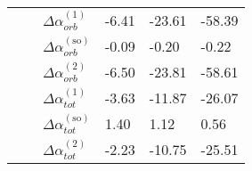 \begin{longtable}{llllll}
      &         & $\Delta \alpha_{orb}^{(\text{1})}$ &         -6.41 &      -23.61 &      -58.39 \\
      &         & $\Delta \alpha_{orb}^{(\text{so})}$ &         -0.09 &       -0.20 &       -0.22 \\
      &         & $\Delta \alpha_{orb}^{(\text{2})}$ &         -6.50 &      -23.81 &      -58.61 \\
      &         & $\Delta \alpha_{tot}^{(\text{1})}$ &         -3.63 &      -11.87 &      -26.07 \\
      &         & $\Delta \alpha_{tot}^{(\text{so})}$ &          1.40 &        1.12 &        0.56 \\
      &         & $\Delta \alpha_{tot}^{(\text{2})}$ &         -2.23 &      -10.75 &      -25.51 \\
\end{longtable}
